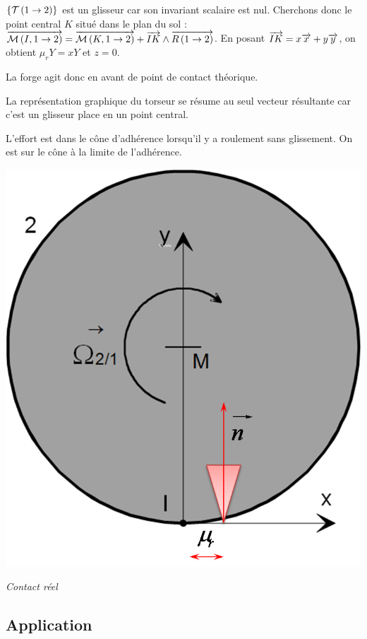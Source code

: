 \documentclass[10pt]{article}
\begin{document}
\begin{minipage}[c]{.65\linewidth}
$\left\{\mathcal{T} \left(1\rightarrow 2 \right) \right\}$ est un glisseur car son invariant scalaire est nul. Cherchons donc le point central $K$ situé dans le plan du sol :
$\overrightarrow{\mathcal{M}\left( {I}, {1} \rightarrow {2}\right)} = \overrightarrow{\mathcal{M}\left( {K}, {1} \rightarrow {2}\right)} + \overrightarrow{IK}\wedge \overrightarrow{R\left( {1} \rightarrow {2}\right)}$. 
En posant $\overrightarrow{IK} = x\overrightarrow{x} + y\overrightarrow{y}$, on obtient $\mu_r Y = x Y$ et $z=0$.

La forge agit donc en avant de point de contact théorique. 

La représentation graphique du torseur se résume au seul vecteur résultante car c'est un glisseur place en un point central.

L'effort est dans le cône d'adhérence lorsqu'il y a roulement sans glissement. On est sur le cône à la limite de l'adhérence. 
\end{minipage} \hfill
\begin{minipage}[c]{.3\linewidth}
\begin{center}
\includegraphics[width=.95\textwidth]{images/roule_03}

\textit{Contact réel}
\end{center}
\end{minipage}


\subsection{Application}
\end{document}
